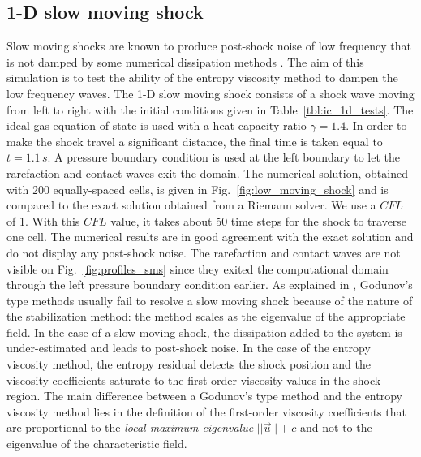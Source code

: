 \documentclass[preprint,10pt]{elsarticle}
\newcommand{\fig}[1]{Fig.~\ref{#1}}                      %
\newcommand{\tbl}[1]{Table~\ref{#1}}                     %
\begin{document}
\subsection{1-D slow moving shock} \label{sec:slow_moving_shock}

Slow moving shocks are known to produce post-shock noise of low frequency that is not damped by some 
numerical dissipation methods \cite{james}. The aim of this simulation is to test the ability of the 
entropy viscosity method to dampen the low frequency waves.
The 1-D slow moving shock consists of a shock wave moving from left to right with the initial conditions 
given in \tbl{tbl:ic_1d_tests}. The ideal gas equation of state is used with a heat capacity ratio 
$\gamma=1.4$.  In order to make the shock travel a significant distance, the final time is taken 
equal to $t=1.1\,s$. A pressure boundary condition is used at the left boundary to let the rarefaction 
and contact waves exit the domain.   
%
The numerical solution, obtained with 200 equally-spaced cells, is given in \fig{fig:low_moving_shock} 
and is compared to the exact solution obtained from a Riemann solver. We use a $CFL$ of 1. With this 
$CFL$ value, it takes about 50 time steps for the shock to traverse one cell.
%
The numerical results are in good agreement with the exact solution and do not display any post-shock 
noise. The rarefaction and contact waves are not visible on \fig{fig:profiles_sms} since they exited 
the computational domain through the left pressure boundary condition earlier. As explained in 
\cite{roberts}, Godunov's type methods usually fail to resolve a slow moving shock because of the 
nature of the stabilization method: the method scales as the eigenvalue of the appropriate field. 
In the case of a slow moving shock, the dissipation added to the system is under-estimated and leads 
to post-shock noise. In the case of the entropy viscosity method, the entropy residual detects 
the shock position and the viscosity coefficients saturate to the first-order viscosity values in 
the shock region. The main difference between a  Godunov's type method and the entropy viscosity 
method lies in the definition of the first-order viscosity coefficients that are proportional to 
the \emph{local maximum eigenvalue} $||\vec{u}||+c$ and not to the eigenvalue of the characteristic field.
%
\end{document}
